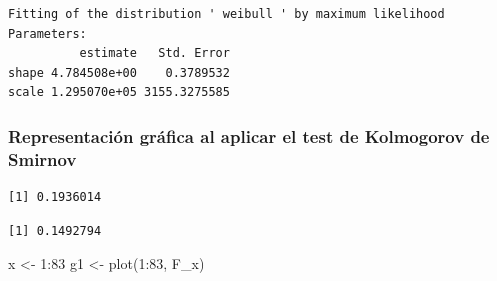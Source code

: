 \documentclass[
  us-letterpaper,
]{scrreprt}
\newenvironment{Shaded}{\begin{snugshade}}{\end{snugshade}}
\newcommand{\AttributeTok}[1]{\textcolor[rgb]{0.40,0.45,0.13}{#1}}
\newcommand{\CommentTok}[1]{\textcolor[rgb]{0.37,0.37,0.37}{#1}}
\newcommand{\ConstantTok}[1]{\textcolor[rgb]{0.56,0.35,0.01}{#1}}
\newcommand{\ControlFlowTok}[1]{\textcolor[rgb]{0.00,0.23,0.31}{\textbf{#1}}}
\newcommand{\DecValTok}[1]{\textcolor[rgb]{0.68,0.00,0.00}{#1}}
\newcommand{\FloatTok}[1]{\textcolor[rgb]{0.68,0.00,0.00}{#1}}
\newcommand{\FunctionTok}[1]{\textcolor[rgb]{0.28,0.35,0.67}{#1}}
\newcommand{\NormalTok}[1]{\textcolor[rgb]{0.00,0.23,0.31}{#1}}
\newcommand{\OtherTok}[1]{\textcolor[rgb]{0.00,0.23,0.31}{#1}}
\newcommand{\SpecialCharTok}[1]{\textcolor[rgb]{0.37,0.37,0.37}{#1}}
\theoremstyle{definition}
\theoremstyle{plain}
\theoremstyle{plain}
\theoremstyle{remark}
\begin{document}
\begin{verbatim}
Fitting of the distribution ' weibull ' by maximum likelihood 
Parameters:
          estimate   Std. Error
shape 4.784508e+00    0.3789532
scale 1.295070e+05 3155.3275585
\end{verbatim}

\begin{Shaded}
\end{Shaded}

\subsubsection{Representación gráfica al aplicar el test de Kolmogorov
de
Smirnov}\label{representaciuxf3n-gruxe1fica-al-aplicar-el-test-de-kolmogorov-de-smirnov}

\begin{verbatim}
[1] 0.1936014
\end{verbatim}

\begin{verbatim}
[1] 0.1492794
\end{verbatim}

\begin{Shaded}
\begin{Highlighting}[]
\NormalTok{x }\OtherTok{\textless{}{-}} \DecValTok{1}\SpecialCharTok{:}\DecValTok{83} 
\NormalTok{g1 }\OtherTok{\textless{}{-}} \FunctionTok{plot}\NormalTok{(}\DecValTok{1}\SpecialCharTok{:}\DecValTok{83}\NormalTok{, F\_x) }
\end{Highlighting}
\end{Shaded}
\end{document}
